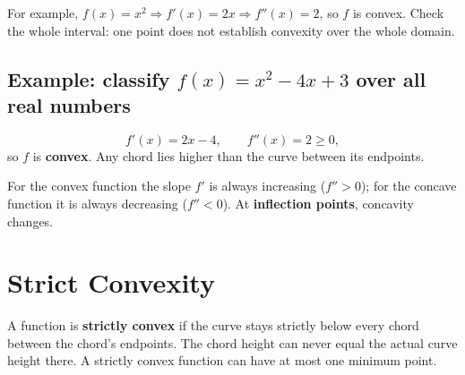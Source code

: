 \documentclass[11pt]{article}
\begin{document}
For example, $f(x) = x^2 \Rightarrow f'(x) = 2x \Rightarrow f''(x) = 2$, so $f$ is
convex. Check the whole interval: one point does not establish convexity over the
whole domain.

\subsection*{Example: classify $f(x) = x^2 - 4x + 3$ over all real numbers}

\[
    f'(x) = 2x - 4, \qquad f''(x) = 2 \ge 0,
\]
so $f$ is \textbf{convex}. Any chord lies higher than the curve between its
endpoints.

\begin{center}
\end{center}

For the convex function the slope $f'$ is always increasing ($f'' > 0$); for the
concave function it is always decreasing ($f'' < 0$). At \textbf{inflection
points}, concavity changes.

\section{Strict Convexity}

A function is \textbf{strictly convex} if the curve stays strictly below every chord
between the chord's endpoints. The chord height can never equal the actual curve
height there. A strictly convex function can have at most one minimum point.
\end{document}

